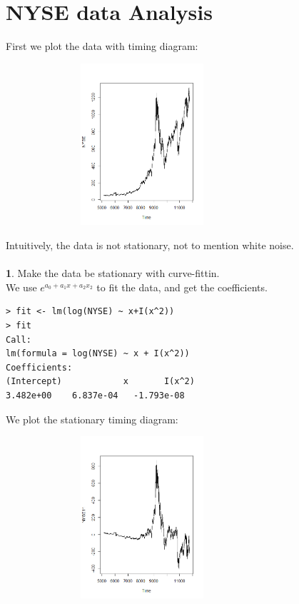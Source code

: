 \documentclass[twoside,11pt]{article}
\begin{document}
\section{NYSE data Analysis}
\noindent First we plot the data with timing diagram:
\begin {figure}[h]
\centering
\includegraphics[width=8cm,height=6cm]{NYSE.png}
\end {figure}

\noindent Intuitively, the data is not stationary, not to mention white noise.\\
\\
\noindent \textbf{1}. Make the data be stationary with curve-fittin.\\ 
We use $e^{a_0+a_1x+a_2x_2}$ to fit the data, and get the coefficients.
\begin{verbatim}
> fit <- lm(log(NYSE) ~ x+I(x^2))
> fit
Call:
lm(formula = log(NYSE) ~ x + I(x^2))
Coefficients:
(Intercept)            x       I(x^2)
3.482e+00    6.837e-04   -1.793e-08
\end{verbatim}

We plot the stationary timing diagram:\\

\begin {figure}[h]
\centering
\includegraphics[width=8cm,height=6cm]{NYSE11.png}
\end {figure}
\end{document}

